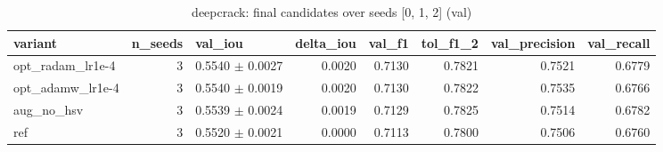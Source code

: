 \begin{table}
\caption{deepcrack: final candidates over seeds [0, 1, 2] (val)}
\label{tab:ablation_deepcrack_final}
\begin{tabular}{lrlrrrrr}
\toprule
variant & n\_seeds & val\_iou & delta\_iou & val\_f1 & tol\_f1\_2 & val\_precision & val\_recall \\
\midrule
opt\_radam\_lr1e-4 & 3 & 0.5540 $\pm$ 0.0027 & 0.0020 & 0.7130 & 0.7821 & 0.7521 & 0.6779 \\
opt\_adamw\_lr1e-4 & 3 & 0.5540 $\pm$ 0.0019 & 0.0020 & 0.7130 & 0.7822 & 0.7535 & 0.6766 \\
aug\_no\_hsv & 3 & 0.5539 $\pm$ 0.0024 & 0.0019 & 0.7129 & 0.7825 & 0.7514 & 0.6782 \\
ref & 3 & 0.5520 $\pm$ 0.0021 & 0.0000 & 0.7113 & 0.7800 & 0.7506 & 0.6760 \\
\bottomrule
\end{tabular}
\end{table}
